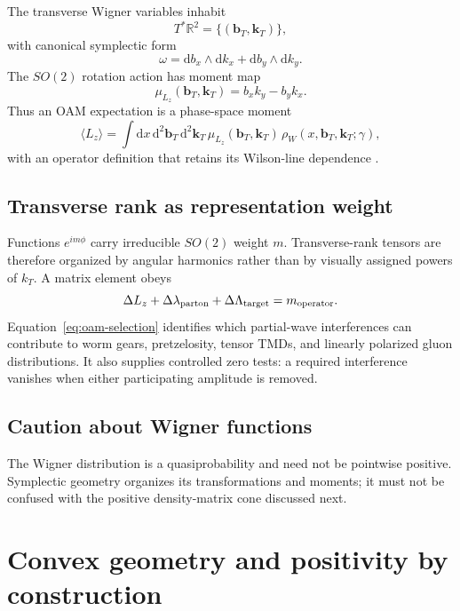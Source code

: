 \documentclass[11pt]{article}
\newcommand{\kT}{\bm{k}_{T}}
\newcommand{\bT}{\bm{b}_{T}}
\newcommand{\dd}{\mathrm{d}}
\begin{document}
The transverse Wigner variables inhabit
\begin{equation}
T^*\mathbb R^2
=\{(\bT,\kT)\},
\end{equation}
with canonical symplectic form
\begin{equation}
\omega
=\dd b_x\wedge\dd k_x+\dd b_y\wedge\dd k_y.
\label{eq:symplectic-form}
\end{equation}
The \(SO(2)\) rotation action has moment map
\begin{equation}
\mu_{L_z}(\bT,\kT)
=b_xk_y-b_yk_x.
\label{eq:moment-map}
\end{equation}
Thus an OAM expectation is a phase-space moment
\begin{equation}
\langle L_z\rangle
=
\int\dd x\,\dd^2\bT\,\dd^2\kT\,
\mu_{L_z}(\bT,\kT)\,
\rho_W(x,\bT,\kT;\gamma),
\label{eq:oam-wigner}
\end{equation}
with an operator definition that retains its Wilson-line dependence
\cite{Lorce2012}.

\subsection{Transverse rank as representation weight}

Functions \(e^{im\phi}\) carry irreducible \(SO(2)\) weight \(m\).
Transverse-rank tensors are therefore organized by angular harmonics rather
than by visually assigned powers of \(k_T\).  A matrix element obeys
\begin{equation}
\Delta L_z+\Delta\lambda_{\rm parton}
+\Delta\Lambda_{\rm target}=m_{\rm operator}.
\label{eq:oam-selection}
\end{equation}
Equation~\eqref{eq:oam-selection} identifies which partial-wave
interferences can contribute to worm gears, pretzelosity, tensor TMDs, and
linearly polarized gluon distributions.  It also supplies controlled
zero tests: a required interference vanishes when either participating
amplitude is removed.

\subsection{Caution about Wigner functions}

The Wigner distribution is a quasiprobability and need not be pointwise
positive.  Symplectic geometry organizes its transformations and moments;
it must not be confused with the positive density-matrix cone discussed
next.

\section{Convex geometry and positivity by construction}
\end{document}
